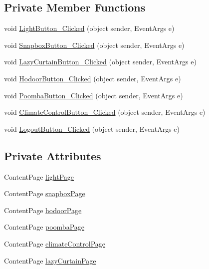 \subsection*{Private Member Functions}
\begin{DoxyCompactItemize}
\item 
void \mbox{\hyperlink{class_f_w_p_s___app_1_1_main_page_a13668c48ee1b286dd61b5ca4cce5e420}{Light\+Button\+\_\+\+Clicked}} (object sender, Event\+Args e)
\item 
void \mbox{\hyperlink{class_f_w_p_s___app_1_1_main_page_ab848c0d2c36a990020e6c034ca59a7ee}{Snapbox\+Button\+\_\+\+Clicked}} (object sender, Event\+Args e)
\item 
void \mbox{\hyperlink{class_f_w_p_s___app_1_1_main_page_a042e5725fa41937b73c14cb1c6cc6732}{Lazy\+Curtain\+Button\+\_\+\+Clicked}} (object sender, Event\+Args e)
\item 
void \mbox{\hyperlink{class_f_w_p_s___app_1_1_main_page_a22b37582195ee5fd4fd31602d94b089a}{Hodoor\+Button\+\_\+\+Clicked}} (object sender, Event\+Args e)
\item 
void \mbox{\hyperlink{class_f_w_p_s___app_1_1_main_page_a90fa536c6b12549ecc557f8f5c39e3b6}{Poomba\+Button\+\_\+\+Clicked}} (object sender, Event\+Args e)
\item 
void \mbox{\hyperlink{class_f_w_p_s___app_1_1_main_page_afa5ef3c649e06aed7b433db975e1b1e9}{Climate\+Control\+Button\+\_\+\+Clicked}} (object sender, Event\+Args e)
\item 
void \mbox{\hyperlink{class_f_w_p_s___app_1_1_main_page_ac646ff6b51bf24320feeb9293181841b}{Logout\+Button\+\_\+\+Clicked}} (object sender, Event\+Args e)
\end{DoxyCompactItemize}
\subsection*{Private Attributes}
\begin{DoxyCompactItemize}
\item 
Content\+Page \mbox{\hyperlink{class_f_w_p_s___app_1_1_main_page_a864a82b82cf9d586d959cf192412cebd}{light\+Page}}
\item 
Content\+Page \mbox{\hyperlink{class_f_w_p_s___app_1_1_main_page_aba8a6834b65d9019cd66830cc3c32dc6}{snapbox\+Page}}
\item 
Content\+Page \mbox{\hyperlink{class_f_w_p_s___app_1_1_main_page_a916dfeb68ac14108894be6cc350e8d5b}{hodoor\+Page}}
\item 
Content\+Page \mbox{\hyperlink{class_f_w_p_s___app_1_1_main_page_aeda288d8d969d08c689eebe619c5aac2}{poomba\+Page}}
\item 
Content\+Page \mbox{\hyperlink{class_f_w_p_s___app_1_1_main_page_add7db8fcb6edb720574de690540bc827}{climate\+Control\+Page}}
\item 
Content\+Page \mbox{\hyperlink{class_f_w_p_s___app_1_1_main_page_a6191273f4c1056a5da465d84668151ba}{lazy\+Curtain\+Page}}
\end{DoxyCompactItemize}


